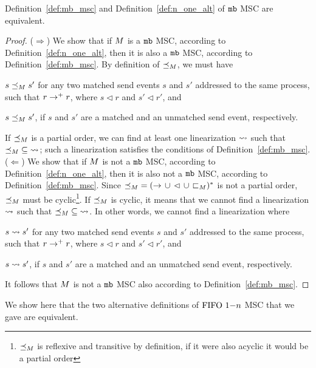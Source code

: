 \begin{proposition}
    Definition~\ref{def:mb_msc} and Definition~\ref{def:n_one_alt} of $\mathtt{mb}$ MSC are equivalent.
\end{proposition}
\begin{proof}
    ($\Rightarrow$)  We show that if $M$ is a $\mathtt{mb}$ MSC, according to Definition~\ref{def:n_one_alt}, then it is also a $\mathtt{mb}$ MSC, according to Definition~\ref{def:mb_msc}. By definition of $\preceq_M$, we must have 
    \begin{enumerate*}[label={(\roman*)}]
        \item $s \preceq_M s'$ for any two matched send events $s$ and $s'$ addressed to the same process, such that $r \to^+ r$, where $s \lhd r$ and $s' \lhd r'$, and
        \item $s \preceq_M s'$, if $s$ and $s'$ are a matched and an unmatched send event, respectively.
    \end{enumerate*} 
    If $\preceq_M$ is a partial order, we can find at least one linearization $\rightsquigarrow$ such that $\preceq_M \;\subseteq\; \rightsquigarrow$; such a linearization satisfies the conditions of Definition~\ref{def:mb_msc}.\newline
    ($\Leftarrow$) We show that if $M$ is not a $\mathtt{mb}$ MSC, according to Definition~\ref{def:n_one_alt}, then it is also not a $\mathtt{mb}$ MSC, according to Definition~\ref{def:mb_msc}. Since ${\preceq_M} = ({\to} \,\cup\, {\lhd} \,\cup\, {\sqsubset_M})^\ast$ is not a partial order, $\preceq_M$ must be cyclic\footnote{$\preceq_M$ is reflexive and transitive by definition, if it were also acyclic it would be a partial order}. If $\preceq_M$ is cyclic, it means that we cannot find a linearization $\rightsquigarrow$ such that $\preceq_M \;\subseteq\; \rightsquigarrow$. In other words, we cannot find a linearization where      
    \begin{enumerate*}[label={(\roman*)}]
        \item $s \rightsquigarrow s'$ for any two matched send events $s$ and $s'$ addressed to the same process, such that $r \to^+ r$, where $s \lhd r$ and $s' \lhd r'$, and
        \item $s \rightsquigarrow s'$, if $s$ and $s'$ are a matched and an unmatched send event, respectively.
    \end{enumerate*} 
    It follows that $M$ is not a $\mathtt{mb}$ MSC also according to Definition~\ref{def:mb_msc}.
\end{proof}

We show here that the two alternative definitions of $\text{FIFO } 1\mathsf{-}n$ MSC that we gave are equivalent.

